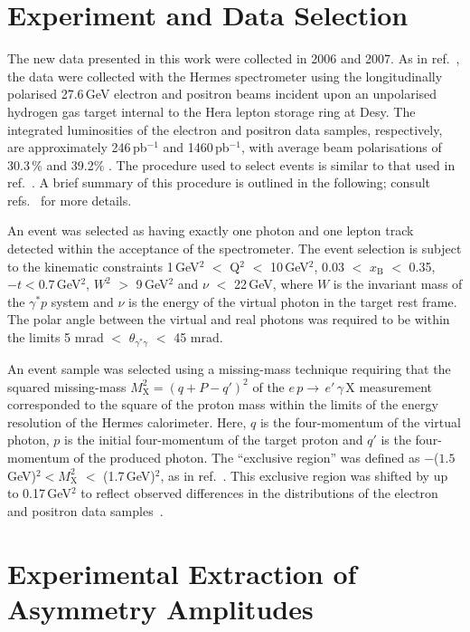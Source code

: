 \section{Experiment and Data Selection}
The new data presented in this work were collected in 2006 and 2007. As in ref.~\cite{Air09}, the data were collected with the H{\sc ermes}
spectrometer \cite{Ack98} using the longitudinally polarised 27.6\,GeV
electron and positron beams incident upon an unpolarised hydrogen gas
target internal to the H{\sc era} lepton storage ring at D{\sc esy}. The integrated luminosities of the electron and positron data samples, respectively, are
approximately 246\,pb$^{-1}$ and 1460\,pb$^{-1}$, with average beam polarisations of 30.3\,\% and 39.2\% \cite{Ben01}. The procedure used to select events is similar to that used in ref.~\cite{Air09}.
A brief summary of this procedure is outlined in the following; consult
refs.~\cite{Zei09,Bur10} for more details. 

An event
was selected as having exactly one photon and one lepton
track detected within the acceptance of the spectrometer.
The event selection is subject to the kinematic constraints 1\,GeV$^{2}$ $<$
Q$^{2}$ $<$ 10\,GeV$^{2}$, 0.03 $<$ $x_{\textrm{B}}$ $<$ 0.35,
$-t < 0.7$\,GeV$^2$, $W^{2}$ $>$
9\,GeV$^{2}$ and $\nu$ $<$ 22\,GeV, where $W$ is the invariant mass of the
$\gamma^{*}p$ system and $\nu$ is the energy of the virtual photon in the target
rest frame. The polar angle between the virtual and real photons was required to
be within the limits 5 mrad $<$
$\theta_{\gamma^{*}\gamma}$ $<$ 45 mrad. 

An event sample was selected using a missing-mass technique requiring
that the squared missing-mass $M_{\textrm{X}}^{2}=(q+P-q')^{2}$
of the $e\,p \rightarrow\, e'\,\gamma\, \textrm{X}$ measurement
corresponded to the square of the proton mass within the limits of the
energy resolution of the H{\sc ermes} calorimeter. Here, $q$ is the
four-momentum of the virtual photon, $p$ is the initial four-momentum
of the target proton and $q'$ is the four-momentum of the produced
photon. The ``exclusive region'' was defined as $-$($1.5$\,GeV)$^{2} <
M_{\textrm{X}}^{2}$ $<$ (1.7\,GeV)$^{2}$, as in
ref.~\cite{Air09}. This exclusive region was shifted by up to
0.17\,GeV$^{2}$ to reflect observed differences in the distributions of the electron and positron data samples~\cite{Bur10}. 

\section{Experimental Extraction of Asymmetry Amplitudes}

